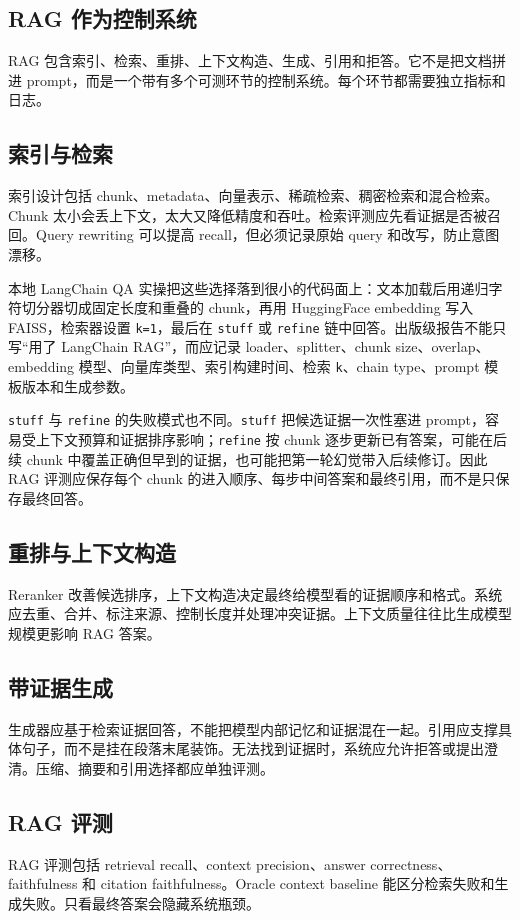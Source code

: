 \documentclass[UTF8,zihao=-4,openany]{ctexbook}
\begin{document}
\subsection{RAG 作为控制系统}
RAG 包含索引、检索、重排、上下文构造、生成、引用和拒答。它不是把文档拼进 prompt，而是一个带有多个可测环节的控制系统。每个环节都需要独立指标和日志。

\subsection{索引与检索}
索引设计包括 chunk、metadata、向量表示、稀疏检索、稠密检索和混合检索。Chunk 太小会丢上下文，太大又降低精度和吞吐。检索评测应先看证据是否被召回。Query rewriting 可以提高 recall，但必须记录原始 query 和改写，防止意图漂移。

本地 LangChain QA 实操把这些选择落到很小的代码面上：文本加载后用递归字符切分器切成固定长度和重叠的 chunk，再用 HuggingFace embedding 写入 FAISS，检索器设置 \texttt{k=1}，最后在 \texttt{stuff} 或 \texttt{refine} 链中回答。出版级报告不能只写“用了 LangChain RAG”，而应记录 loader、splitter、chunk size、overlap、embedding 模型、向量库类型、索引构建时间、检索 \texttt{k}、chain type、prompt 模板版本和生成参数。

\texttt{stuff} 与 \texttt{refine} 的失败模式也不同。\texttt{stuff} 把候选证据一次性塞进 prompt，容易受上下文预算和证据排序影响；\texttt{refine} 按 chunk 逐步更新已有答案，可能在后续 chunk 中覆盖正确但早到的证据，也可能把第一轮幻觉带入后续修订。因此 RAG 评测应保存每个 chunk 的进入顺序、每步中间答案和最终引用，而不是只保存最终回答。

\subsection{重排与上下文构造}
Reranker 改善候选排序，上下文构造决定最终给模型看的证据顺序和格式。系统应去重、合并、标注来源、控制长度并处理冲突证据。上下文质量往往比生成模型规模更影响 RAG 答案。

\subsection{带证据生成}
生成器应基于检索证据回答，不能把模型内部记忆和证据混在一起。引用应支撑具体句子，而不是挂在段落末尾装饰。无法找到证据时，系统应允许拒答或提出澄清。压缩、摘要和引用选择都应单独评测。

\subsection{RAG 评测}
RAG 评测包括 retrieval recall、context precision、answer correctness、faithfulness 和 citation faithfulness。Oracle context baseline 能区分检索失败和生成失败。只看最终答案会隐藏系统瓶颈。
\end{document}
